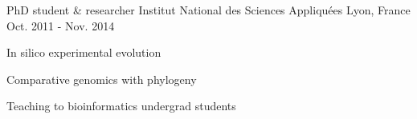 \begin{cventries}
  \cventry
    {PhD student \& researcher} %
    {Institut National des Sciences Appliquées} %
    {Lyon, France} %
    {Oct. 2011 - Nov. 2014} %
    {
      \begin{cvitems} %
        \item {In silico experimental evolution}
        \item {Comparative genomics with phylogeny}
        \item {Teaching to bioinformatics undergrad students}
      \end{cvitems}
    }

\end{cventries}

